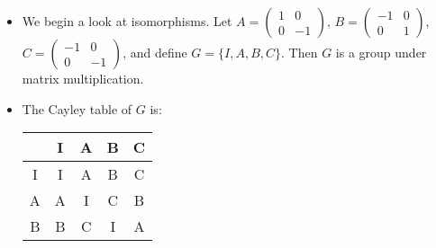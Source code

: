 \begin{itemize}
\begin{proof}
\begin{equation}
        \end{equation}
        and $g$ is a bijection because
        \begin{align}
            h:S_n \setminus A_n \rightarrow A_n \\ 
            \sigma \mapsto \tau\sigma
        \end{align}
        is its inverse. Therefore:
        \begin{equation}
            |A_n| = |S_n \setminus A_n|.
        \end{equation}
        Since $S_n = A_n \sqcup (S_n \setminus A_n)$, we have:
        \begin{align}
            |S_n| &= |A_n| + |S_n \setminus A_n| \\ 
            &= 2|A_n|
        \end{align}
    \end{proof}
    \item We begin a look at isomorphisms. Let $A=\begin{pmatrix}
        1&0\\0&-1
    \end{pmatrix}$, $B=\begin{pmatrix}
        -1&0\\ 0&1
    \end{pmatrix}$, $C=\begin{pmatrix}
        -1&0\\0&-1
    \end{pmatrix}$, and define $G=\{I,A,B,C\}$. Then $G$ is a group under matrix multiplication.
    \item The Cayley table of $G$ is:
    \begin{center}
        \begin{tabular}{c|cccc}
            \cline{2-5}
                                    & \multicolumn{1}{c|}{I} & \multicolumn{1}{c|}{A} & \multicolumn{1}{c|}{B} & \multicolumn{1}{c|}{C} \\ \hline
            \multicolumn{1}{|c|}{I} & I                      & A                      & B                      & C                      \\ \cline{1-1}
            \multicolumn{1}{|c|}{A} & A                      & I                      & C                      & B                      \\ \cline{1-1}
            \multicolumn{1}{|c|}{B} & B                      & C                      & I                      & A                      \\ \cline{1-1}

\end{tabular}
\end{center}
\end{itemize}
